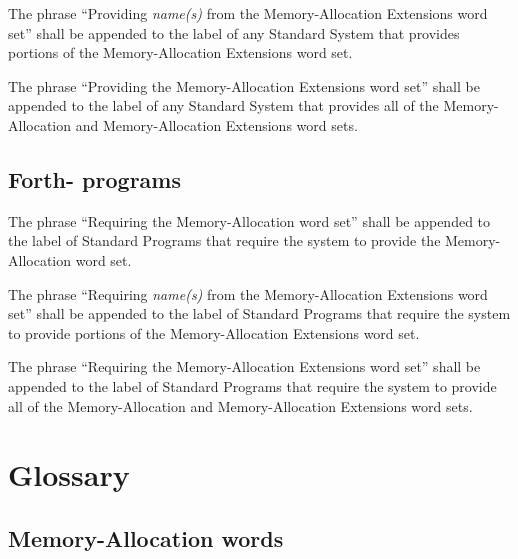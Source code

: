 The phrase ``Providing \emph{name(s)} from the Memory-Allocation
Extensions word set'' shall be appended to the label of any Standard
System that provides portions of the Memory-Allocation Extensions
word set.

The phrase ``Providing the Memory-Allocation Extensions word set''
shall be appended to the label of any Standard System that provides
all of the Memory-Allocation and Memory-Allocation Extensions word
sets.

\subsection{Forth-\snapshot{} programs} %

The phrase ``Requiring the Memory-Allocation word set'' shall be
appended to the label of Standard Programs that require the system
to provide the Memory-Allocation word set.

The phrase ``Requiring \emph{name(s)} from the Memory-Allocation
Extensions word set'' shall be appended to the label of Standard
Programs that require the system to provide portions of the
Memory-Allocation Extensions word set.

The phrase ``Requiring the Memory-Allocation Extensions word set''
shall be appended to the label of Standard Programs that require
the system to provide all of the Memory-Allocation and
Memory-Al\-lo\-ca\-tion Extensions word sets.

\pagebreak
\vspace*{-6ex}
\section{Glossary} %

\subsection{Memory-Allocation words} %


